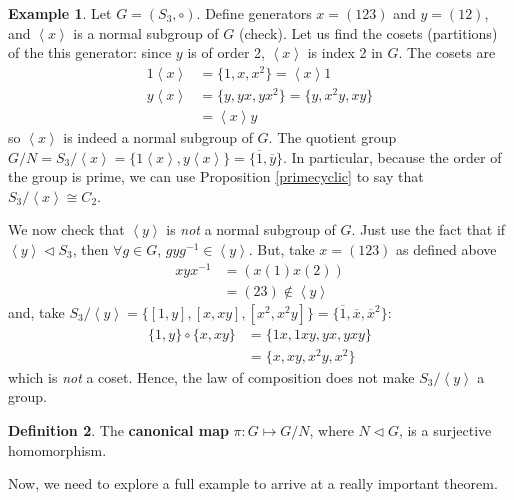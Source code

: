\documentclass[11pt]{amsart} %
\theoremstyle{definition}
\newtheorem{definition}{Definition}[section]
\newtheorem{example}[definition]{Example}
\theoremstyle{definition}
\numberwithin{equation}{section}
\newcommand{\cyclic}[1]{\left\langle #1 \right\rangle}
\newcommand{\qgroup}[2]{#1 / #2}
\begin{document}
\begin{example}
	Let $G=(S_3,\circ)$. Define generators $x=(123)$ and $y=(12)$, and $\cyclic{x} $ is a normal subgroup of $G$ (check). Let us find the cosets (partitions) of the this generator: since $y$ is of order 2, $\cyclic{x}$ is index 2 in $G$. The cosets are
	$$\begin{aligned}
	1 \cyclic{x} &= \{ 1, x, x^2\} = \cyclic{x} 1 \\
	y \cyclic{x} &= \{ y, yx, y x^2 \} = \{ y, x^2 y, xy \} \\
	&= \cyclic{x} y
	\end{aligned}$$
	so $\cyclic{x}$ is indeed a normal subgroup of $G$. The quotient group $G / N = S_3 / \cyclic{x} = \{  1 \cyclic{x}, y \cyclic{x} \} = \{ \overline{1}, \overline{y}  \}$. In particular, because the order of the group is prime, we can use Proposition \ref{primecyclic} to say that $S_3 / \cyclic{x} \cong C_2$.
	
	We now check that $\cyclic{y}$ is \textit{not} a normal subgroup of $G$. Just use the fact that if $\cyclic{y}  \lhd S_3$, then $\forall g \in G$, $g y g^{-1 } \in \cyclic{y} $. But, take $x=(123)$ as defined above
	$$\begin{aligned}
	x y x^{-1} &= ( x(1) x(2) ) \\
	&= ( 23 ) \notin \cyclic{y} 
	\end{aligned}$$
	and, take $\qgroup{S_3}{ \cyclic{y}} = \{ [1,y], [x,xy], [x^2, x^2 y] \} = \{ \overline{1} , \overline{x}, \overline{x}^2 \}$:
	$$\begin{aligned}
	\{ 1,y \} \circ \{ x,xy \} &= \{ 1x, 1xy, yx, yxy \} \\
	&= \{ x, xy, x^2 y, x^2 \} 
	\end{aligned}$$
	which is \textit{not} a coset. Hence, the law of composition does not make $\qgroup{S_3}{ \cyclic{y}} $ a group.
\end{example}

\begin{definition}
	The \textbf{canonical map} $\pi : G \mapsto \qgroup{G}{N}$, where $N \lhd G$, is a surjective homomorphism. 
\end{definition}

Now, we need to explore a full example to arrive at a really important theorem.
\end{document}
